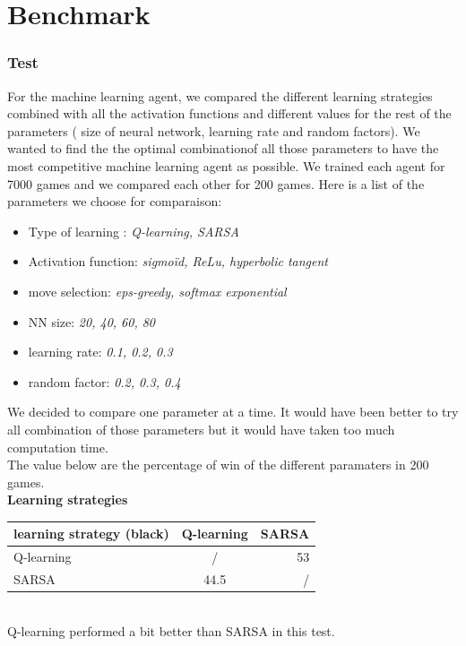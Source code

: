 \documentclass{article}
\begin{document}
\section{Benchmark} \label{sec:benchmark}

\subsubsection{Test}
For the machine learning agent, we compared the different learning strategies combined with all the activation functions and different values for the rest of the parameters ( size of neural network, learning rate and random factors). We wanted to find the the optimal combinationof all those parameters to have the most competitive machine learning agent as possible.
We trained each agent for 7000 games and we compared each other for 200 games.
Here is a list of the parameters we choose for comparaison:
\begin{itemize}
    \item Type of learning : \textit{ Q-learning, SARSA}
    \item Activation function: \textit{sigmoïd, ReLu, hyperbolic tangent}
    \item move selection: \textit{eps-greedy, softmax exponential}
    \item NN size: \textit{20, 40, 60, 80}
    \item learning rate: \textit{0.1, 0.2, 0.3}
    \item random factor: \textit{0.2, 0.3, 0.4}
\end{itemize}
We decided to compare one parameter at a time. It would have been better to try all combination of those parameters but it would have taken too much computation time. \\

The value below are the percentage of win of the different paramaters in 200 games. \\

\textbf{Learning strategies}
\\
\begin{tabular}{|l|c|r|}
  \hline
  learning strategy (black) & Q-learning & SARSA \\
  \hline
  Q-learning & / & 53 \\
  SARSA & 44.5 & / \\
  \hline
\end{tabular}
\\
Q-learning performed a bit better than SARSA in this test. \\
\end{document}
